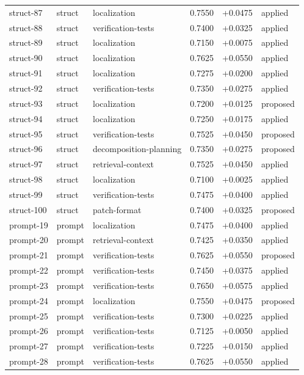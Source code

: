 \begin{center}
\begin{longtable}{llp{5.2cm}rrl}
struct-87 & struct & localization & 0.7550 & +0.0475 & applied \\
struct-88 & struct & verification-tests & 0.7400 & +0.0325 & applied \\
struct-89 & struct & localization & 0.7150 & +0.0075 & applied \\
struct-90 & struct & localization & 0.7625 & +0.0550 & applied \\
struct-91 & struct & localization & 0.7275 & +0.0200 & applied \\
struct-92 & struct & verification-tests & 0.7350 & +0.0275 & applied \\
struct-93 & struct & localization & 0.7200 & +0.0125 & proposed \\
struct-94 & struct & localization & 0.7250 & +0.0175 & applied \\
struct-95 & struct & verification-tests & 0.7525 & +0.0450 & proposed \\
struct-96 & struct & decomposition-planning & 0.7350 & +0.0275 & proposed \\
struct-97 & struct & retrieval-context & 0.7525 & +0.0450 & applied \\
struct-98 & struct & localization & 0.7100 & +0.0025 & applied \\
struct-99 & struct & verification-tests & 0.7475 & +0.0400 & applied \\
struct-100 & struct & patch-format & 0.7400 & +0.0325 & proposed \\
prompt-19 & prompt & localization & 0.7475 & +0.0400 & applied \\
prompt-20 & prompt & retrieval-context & 0.7425 & +0.0350 & applied \\
prompt-21 & prompt & verification-tests & 0.7625 & +0.0550 & proposed \\
prompt-22 & prompt & verification-tests & 0.7450 & +0.0375 & applied \\
prompt-23 & prompt & verification-tests & 0.7650 & +0.0575 & applied \\
prompt-24 & prompt & localization & 0.7550 & +0.0475 & proposed \\
prompt-25 & prompt & verification-tests & 0.7300 & +0.0225 & applied \\
prompt-26 & prompt & verification-tests & 0.7125 & +0.0050 & applied \\
prompt-27 & prompt & verification-tests & 0.7225 & +0.0150 & applied \\
prompt-28 & prompt & verification-tests & 0.7625 & +0.0550 & applied \\

\end{longtable}
\end{center}
